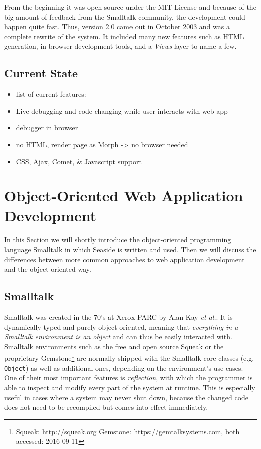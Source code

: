 \documentclass[a4paper,12pt,pagesize,headsepline,oribibl,titlepage]{scrartcl}
\begin{document}
From the beginning it was open source under the MIT License and because of the big amount of feedback from the Smalltalk community, the development could happen quite fast. Thus, version 2.0 came out in October 2003 and was a complete rewrite of the system. It included many new features such as HTML generation, in-browser development tools, and a \emph{Views} layer to name a few. \cite{Fitzl}


\subsection{Current State}
\label{sec:current} 

\begin{itemize}
\item list of current features:
\item Live debugging and code changing while user interacts with web app
\item debugger in browser
\item no HTML, render page as Morph -> no browser needed
\item CSS, Ajax, Comet, \& Javascript support
\end{itemize}

\section{Object-Oriented Web Application Development}

In this Section we will shortly introduce the object-oriented programming language Smalltalk in which Seaside is written and used. Then we will discuss the differences between more common approaches to web application development and the object-oriented way.

\subsection{Smalltalk}

Smalltalk was created in the 70's at Xerox PARC by Alan Kay \emph{et al.}. It is dynamically typed and purely object-oriented, meaning that \emph{everything in a Smalltalk environment is an object} and can thus be easily interacted with. Smalltalk environments such as the free and open source Squeak or the proprietary Gemstone\footnote{Squeak: \url{http://squeak.org} Gemstone: \url{https://gemtalksystems.com}, both accessed: 2016-09-11} are normally shipped with the Smalltalk core classes (e.g. \texttt{Object}) as well as additional ones, depending on the environment's use cases. One of their most important features is \emph{reflection}, with which the programmer is able to inspect and modify every part of the system at runtime. This is especially useful in cases where a system may never shut down, because the changed code does not need to be recompiled but comes into effect immediately. 
\end{document}
